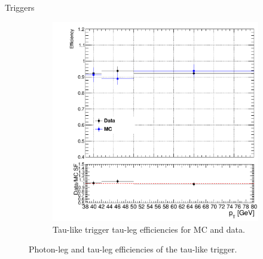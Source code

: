 \documentclass[9pt,aspectratio=1610]{beamer}
\begin{document}
\begin{frame}{Triggers}
\begin{itemize}
\begin{figure}
\begin{subfigure}{0.45\linewidth}
				\includegraphics[width=\textwidth]{figures/misc/tau_trigger_two_prong_efficiencies.pdf}
				\vspace{-2em}
				\caption{Tau-like trigger tau-leg efficiencies for MC and data.}
			\end{subfigure}
			\vspace{-1em}
		\caption{Photon-leg and tau-leg efficiencies of the tau-like trigger.}
		\end{figure}
	\end{itemize}
\end{frame}
\end{document}

